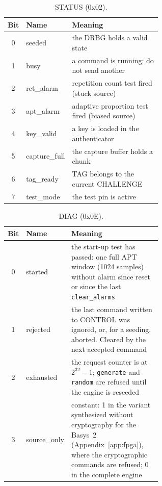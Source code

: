 \begin{table}[htbp]
\centering\small
\caption{STATUS (0x02).}
\label{tab:app_status}
\begin{tabular}{@{}cl>{\raggedright\arraybackslash}p{0.6\linewidth}@{}}
\toprule
Bit & Name & Meaning \\
\midrule
0 & seeded & the \ac{DRBG} holds a valid state \\
1 & busy & a command is running; do not send another \\
2 & rct\_alarm & repetition count test fired (stuck source) \\
3 & apt\_alarm & adaptive proportion test fired (biased source) \\
4 & key\_valid & a key is loaded in the authenticator \\
5 & capture\_full & the capture buffer holds a chunk \\
6 & tag\_ready & TAG belongs to the current CHALLENGE \\
7 & test\_mode & the test pin is active \\
\bottomrule
\end{tabular}
\end{table}

\begin{table}[htbp]
\centering\small
\caption{DIAG (0x0E).}
\label{tab:app_diag}
\begin{tabular}{@{}cl>{\raggedright\arraybackslash}p{0.6\linewidth}@{}}
\toprule
Bit & Name & Meaning \\
\midrule
0 & started & the start-up test has passed: one full \ac{APT} window (1024
  samples) without alarm since reset or since the last
  \texttt{clear\_alarms} \\
1 & rejected & the last command written to CONTROL was ignored, or, for a
  seeding, aborted. Cleared by the next accepted command \\
2 & exhausted & the request counter is at $2^{32}-1$; \texttt{generate} and
  \texttt{random} are refused until the engine is reseeded \\
3 & source\_only & constant: 1 in the variant synthesized without
  cryptography for the Basys~2 (Appendix~\ref{app:fpga}), where the
  cryptographic commands are refused; 0 in the complete engine \\
\bottomrule
\end{tabular}
\end{table}

